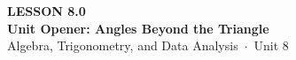 \documentclass[aspectratio=169, 11pt]{beamer}
\begin{document}
{
\begin{frame}[plain]
  \vspace{2.8cm}\hspace{0.55cm}%
  \begin{minipage}{0.9\textwidth}
    {\color{goldacc}\bfseries\small LESSON 8.0}\\[0.5cm]
    {\color{white}\bfseries\LARGE Unit Opener: Angles Beyond the Triangle}\\[1.2cm]
    {\color{mistmid}\small Algebra, Trigonometry, and Data Analysis~$\cdot$~Unit 8}
  \end{minipage}
\end{frame}
}

\begin{frame}[t, plain]
\end{frame}
\end{document}
